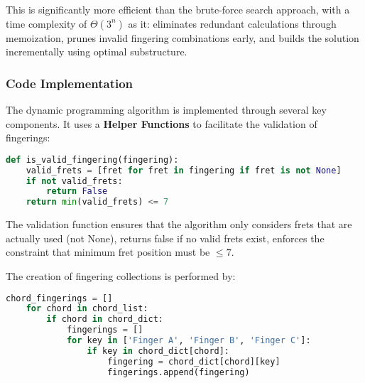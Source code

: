 \documentclass[conference]{IEEEtran}
\begin{document}
This is significantly more efficient than the brute-force search approach, with a time complexity of \(\Theta(3^n)\) as it: eliminates redundant calculations through memoization, prunes invalid fingering combinations early, and builds the solution incrementally using optimal substructure.


\subsubsection{Code Implementation}
The dynamic programming algorithm is implemented through several key components. It uses a \textbf{Helper Functions} to facilitate the validation of fingerings:
\begin{lstlisting}[language=Python]
def is_valid_fingering(fingering):
    valid_frets = [fret for fret in fingering if fret is not None]
    if not valid_frets:
        return False
    return min(valid_frets) <= 7
\end{lstlisting}

The validation function ensures that the algorithm only considers frets that are actually used (not None), returns false if no valid frets exist, enforces the constraint that minimum fret position must be \(\leq 7\).

The creation of fingering collections is performed by:
\newpage
\begin{lstlisting}[language=Python]
    chord_fingerings = []
    for chord in chord_list:
        if chord in chord_dict:
            fingerings = []
            for key in ['Finger A', 'Finger B', 'Finger C']:
                if key in chord_dict[chord]:
                    fingering = chord_dict[chord][key]
                    fingerings.append(fingering)
\end{lstlisting}
\end{document}
